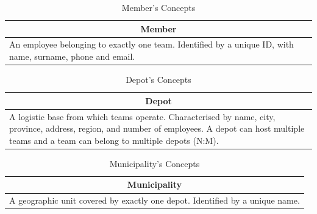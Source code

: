 \begin{table}[H]
    \renewcommand{\arraystretch}{1.3}
    \begin{tabularx}{\textwidth}{|X|}
    \hline \multicolumn{1}{|c|}{\textbf{Member}} \\ \hline
    An employee belonging to exactly one team. Identified by a unique ID, with name, surname, phone and email. \\ \hline
    \end{tabularx}
    \caption{Member's Concepts}
\end{table}

\begin{table}[H]
    \renewcommand{\arraystretch}{1.3}
    \begin{tabularx}{\textwidth}{|X|}
    \hline \multicolumn{1}{|c|}{\textbf{Depot}} \\ \hline
    A logistic base from which teams operate. Characterised by name, city, province, address, region, and
    number of employees. A depot can host multiple teams and a team can belong to multiple depots (N:M). \\ \hline
    \end{tabularx}
    \caption{Depot's Concepts}
\end{table}

\begin{table}[H]
    \renewcommand{\arraystretch}{1.3}
    \begin{tabularx}{\textwidth}{|X|}
    \hline \multicolumn{1}{|c|}{\textbf{Municipality}} \\ \hline
    A geographic unit covered by exactly one depot. Identified by a unique name. \\ \hline
    \end{tabularx}
    \caption{Municipality's Concepts}
\end{table}

